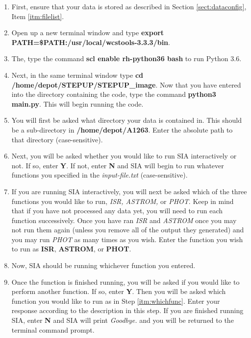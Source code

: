 \documentclass[11pt]{report}
\begin{document}
\begin{enumerate}
\item First, ensure that your data is stored as described in Section \ref{sect:dataconfig}, Item \ref{itm:filelist}.
\item Open up a new terminal window and type {\bf export PATH=\$PATH:/usr/local/wcstools-3.3.3/bin}.
\item The, type the command {\bf scl enable rh-python36 bash} to run Python 3.6.
\item Next, in the same terminal window type {\bf cd /home/depot/STEPUP/STEPUP\_image}. Now that you have entered into the directory containing the code, type the command {\bf python3 main.py}. This will begin running the code.
\item You will first be asked what directory your data is contained in. This should be a sub-directory in {\bf /home/depot/A1263}. Enter the absolute path to that directory (case-sensitive).
\item Next, you will be asked whether you would like to run SIA interactively or not. If so, enter {\bf Y}. If not, enter {\bf N} and SIA will begin to run whatever functions you specified in the \emph{input-file.txt} (case-sensitive).
\item If you are running SIA interactively, you will next be asked which of the three functions you would like to run, \emph{ISR, ASTROM,} or \emph{PHOT}. Keep in mind that if you have not processed any data yet, you will need to run each function successively. Once you have ran \emph{ISR} and \emph{ASTROM} once you may not run them again (unless you remove all of the output they generated) and you may run \emph{PHOT} as many times as you wish. Enter the function you wish to run as {\bf ISR}, {\bf ASTROM}, or {\bf PHOT}. \label{itm:whichfunc}
\item Now, SIA should be running whichever function you entered.
\item Once the function is finished running, you will be asked if you would like to perform another function. If so, enter {\bf Y}. Then you will be asked which function you would like to run as in Step \ref{itm:whichfunc}. Enter your response according to the description in this step. If you are finished running SIA, enter {\bf N} and SIA will print \emph{Goodbye.} and you will be returned to the terminal command prompt.
\end{enumerate}
\end{document}
